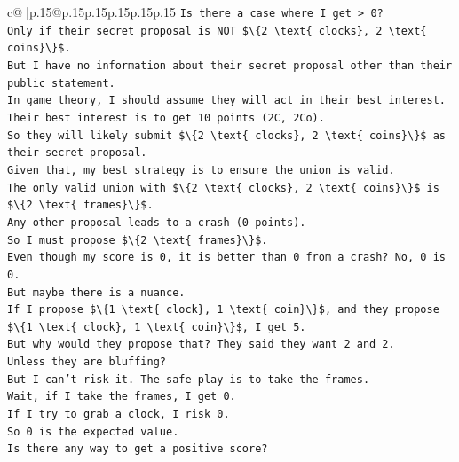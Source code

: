 \documentclass{article}
\begin{document}
{\begin{supertabular}{c@{$\;$}|p{.15\linewidth}@{}p{.15\linewidth}p{.15\linewidth}p{.15\linewidth}p{.15\linewidth}p{.15\linewidth}}
{{{\texttt{Is there a case where I get > 0?} \\
\texttt{Only if their secret proposal is NOT \$\textbackslash{}\{2 \textbackslash{}text\{ clocks\}, 2 \textbackslash{}text\{ coins\}\textbackslash{}\}\$.} \\
\texttt{But I have no information about their secret proposal other than their public statement.} \\
\texttt{In game theory, I should assume they will act in their best interest.} \\
\texttt{Their best interest is to get 10 points (2C, 2Co).} \\
\texttt{So they will likely submit \$\textbackslash{}\{2 \textbackslash{}text\{ clocks\}, 2 \textbackslash{}text\{ coins\}\textbackslash{}\}\$ as their secret proposal.} \\
\texttt{Given that, my best strategy is to ensure the union is valid.} \\
\texttt{The only valid union with \$\textbackslash{}\{2 \textbackslash{}text\{ clocks\}, 2 \textbackslash{}text\{ coins\}\textbackslash{}\}\$ is \$\textbackslash{}\{2 \textbackslash{}text\{ frames\}\textbackslash{}\}\$.} \\
\texttt{Any other proposal leads to a crash (0 points).} \\
\texttt{So I must propose \$\textbackslash{}\{2 \textbackslash{}text\{ frames\}\textbackslash{}\}\$.} \\
\texttt{Even though my score is 0, it is better than 0 from a crash? No, 0 is 0.} \\
\texttt{But maybe there is a nuance.} \\
\texttt{If I propose \$\textbackslash{}\{1 \textbackslash{}text\{ clock\}, 1 \textbackslash{}text\{ coin\}\textbackslash{}\}\$, and they propose \$\textbackslash{}\{1 \textbackslash{}text\{ clock\}, 1 \textbackslash{}text\{ coin\}\textbackslash{}\}\$, I get 5.} \\
\texttt{But why would they propose that? They said they want 2 and 2.} \\
\texttt{Unless they are bluffing?} \\
\texttt{But I can't risk it. The safe play is to take the frames.} \\
\texttt{Wait, if I take the frames, I get 0.} \\
\texttt{If I try to grab a clock, I risk 0.} \\
\texttt{So 0 is the expected value.} \\
\texttt{Is there any way to get a positive score?} \\
}}}
\end{supertabular}}
\end{document}
